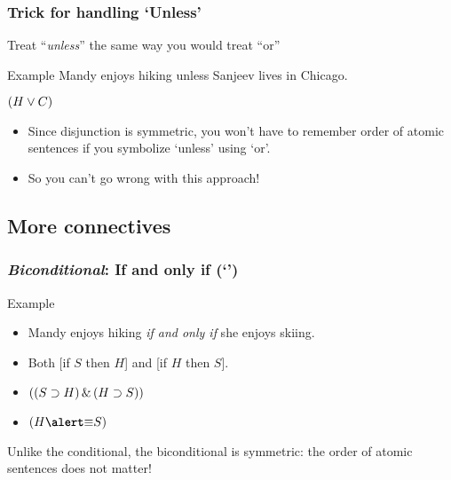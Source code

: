 \begin{frame}
  \frametitle{Trick for handling `Unless'}

  Treat ``\emph{unless}'' the same way you would treat ``or''

  \begin{block}{Example}
  Mandy enjoys hiking unless Sanjeev lives in Chicago.

  $(H \vee C)$
  \end{block}

\begin{itemize}[<2->]

\item Since disjunction is symmetric, you won't have to remember order of atomic sentences if you symbolize `unless' using `or'.

\item So you can't go wrong with this approach!
\end{itemize}

\end{frame}






\subsection{More connectives}

\begin{frame}
  \frametitle{\emph{Biconditional}: If and only if (`\eiff')}

  \begin{block}{Example}
    \begin{itemize}[<+->]
    \item[] Mandy enjoys hiking \emph{if and only if} she enjoys skiing.
    \item[] Both [if $S$ then $H$] and [if $H$ then $S$].
    \item[] $((S \supset H)\,\&\,(H \supset S))$
    \item[] $(H  \emph{\eiff} S)$
    \end{itemize}
  \end{block}

Unlike the conditional, the biconditional is symmetric: the order of atomic sentences does not matter!

\end{frame}

